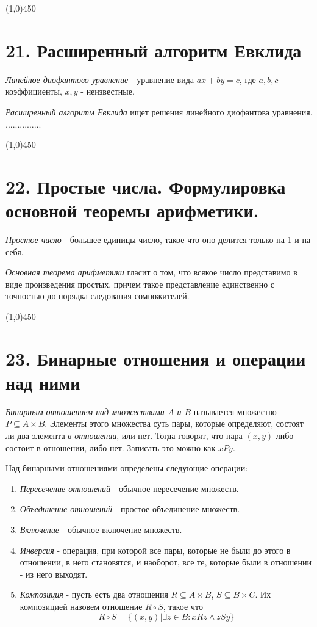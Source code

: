 \documentclass[a4paper,12pt]{article}
\begin{document}
	\begin{center}
		\line(1,0){450}
	\end{center}

	\section*{21. Расширенный алгоритм Евклида}
	\textit{Линейное диофантово уравнение} - уравнение вида $ax + by = c$, где $a, b, c$ - коэффициенты, $x, y$ - неизвестные.

	\textit{Расширенный алгоритм Евклида} ищет решения линейного диофантова уравнения.
	...............

	\begin{center}
		\line(1,0){450}
	\end{center}

	\section*{22. Простые числа. Формулировка основной теоремы арифметики.}
	\textit{Простое число} - большее единицы число, такое что оно делится только на 1 и на себя.

	\textit{Основная теорема арифметики} гласит о том, что всякое число представимо в виде произведения простых, причем такое представление единственно с точностью до порядка следования сомножителей.

	\begin{center}
		\line(1,0){450}
	\end{center}

	\section*{23. Бинарные отношения и операции над ними}
	\textit{Бинарным отношением над множествами $A$ и $B$} называется множество $P \subseteq A \times B$. Элементы этого множества суть пары, которые определяют, состоят ли два элемента \textit{в отношении}, или нет. Тогда говорят, что пара $(x, y)$ либо состоит в отношении, либо нет. Записать это можно как $xPy$.

	Над бинарными отношениями определены следующие операции:
	\begin{enumerate}
		\item \textit{Пересечение отношений} - обычное пересечение множеств.
		\item \textit{Объединение отношений} - простое объединение множеств.
		\item \textit{Включение} - обычное включение множеств.
		\item \textit{Инверсия} - операция, при которой все пары, которые не были до этого в отношении, в него становятся, и наоборот, все те, которые были в отношении - из него выходят.
		\item \textit{Композиция} - пусть есть два отношения $R \subseteq A \times B$, $S \subseteq B \times C$. Их композицией назовем отношение $R \circ S$, такое что
		\[
		R \circ S = \{(x, y) | \exists z \in B : xRz \land zSy \}
		\]
	\end{enumerate}
\end{document}
